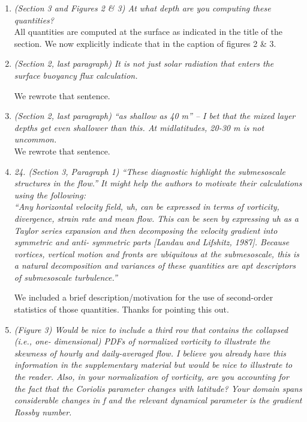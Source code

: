 \documentclass[11pt]{article}
\newcommand{\bdp}{\begin{description}}
\newcommand{\edp}{\end{description}}
\begin{document}
\begin{enumerate}
\item {\it (Section 3 and Figures 2 \& 3) At what depth are you computing these quantities?}\\

  All quantities are computed at the surface as indicated in the title of the
  section. We now explicitly indicate that in the caption of figures 2 \& 3.

\item {\it (Section 2, last paragraph) It is not just solar radiation that enters the surface buoyancy
      flux calculation.}

      We rewrote that sentence.

\item {\it (Section 2, last paragraph) ``as shallow as 40 m'' – I bet that the mixed layer depths get
      even shallower than this. At midlatitudes, 20-30 m is not uncommon.}\\

      We rewrote that sentence.

\item {\it 24. (Section 3, Paragraph 1) ``These diagnostic highlight the submesoscale structures in
      the flow.'' It might help the authors to motivate their calculations using the following:}\\

      {\it ``Any horizontal velocity field, uh, can be expressed in terms of vorticity, divergence,
      strain rate and mean flow. This can be seen by expressing uh as a Taylor series
      expansion and then decomposing the velocity gradient into symmetric and anti-
      symmetric parts [Landau and Lifshitz, 1987]. Because vortices, vertical motion and
      fronts are ubiquitous at the submesoscale, this is a natural decomposition and
      variances of these quantities are apt descriptors of submesoscale turbulence.''}\\

      \bdp
        We included a brief description/motivation for the use of second-order statistics
        of those quantities. Thanks for pointing this out.
      \edp


\item {\it (Figure 3) Would be nice to include a third row that contains the collapsed (i.e., one-
      dimensional) PDFs of normalized vorticity to illustrate the skewness of hourly and
      daily-averaged flow. I believe you already have this information in the supplementary
      material but would be nice to illustrate to the reader. Also, in your normalization of
      vorticity, are you accounting for the fact that the Coriolis parameter changes with
      latitude? Your domain spans considerable changes in f and the relevant dynamical
      parameter is the gradient Rossby number.}


\end{enumerate}
\end{document}
